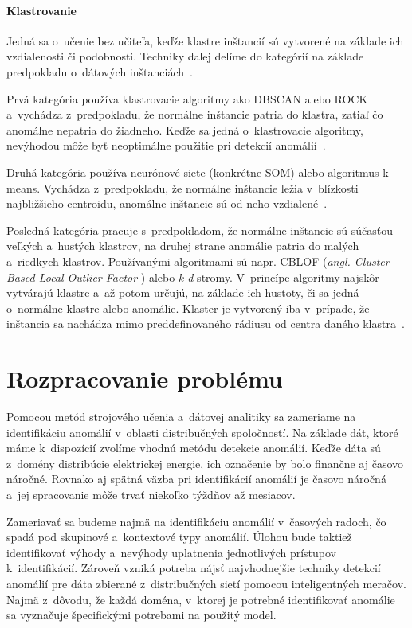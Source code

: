 \documentclass[a4paper,twoside,slovak,12pt]{article}
\begin{document}
\paragraph{Klastrovanie}
Jedná sa o~učenie bez učiteľa, keďže klastre inštancií sú vytvorené na základe
ich vzdialenosti či podobnosti. Techniky ďalej delíme do kategórií na základe
predpokladu o~dátových inštanciách~\cite{Chandola2009,Tan2005}.

Prvá kategória používa klastrovacie algoritmy ako DBSCAN alebo ROCK
a~vychádza z~predpokladu, že normálne inštancie patria do klastra, zatiaľ čo
anomálne nepatria do žiadneho. Keďže sa jedná o~klastrovacie algoritmy, nevýhodou
môže byť neoptimálne použitie pri detekcií anomálií~\cite{Chandola2009}.

Druhá kategória používa neurónové siete (konkrétne SOM) alebo algoritmus k-means.
Vychádza z~predpokladu, že normálne inštancie ležia v~blízkosti najbližšieho
centroidu, anomálne inštancie sú od neho vzdialené~\cite{Chandola2009}.

Posledná kategória pracuje s~predpokladom, že normálne inštancie sú súčasťou
veľkých a~hustých klastrov, na druhej strane anomálie patria do malých a~riedkych
klastrov. Používanými algoritmami sú napr. CBLOF (\textit{angl. Cluster-Based Local Outlier Factor}
) alebo \textit{k-d} stromy. V~princípe algoritmy najskôr vytvárajú klastre
a~až potom určujú, na základe ich hustoty, či sa jedná o~normálne klastre alebo
anomálie. Klaster je vytvorený iba v~prípade, že inštancia sa nachádza mimo
preddefinovaného rádiusu od centra daného klastra~\cite{Salvador2005}.


\newpage
\section{Rozpracovanie problému}
Pomocou metód strojového učenia a~dátovej analitiky sa zameriame na identifikáciu
anomálií v~oblasti distribučných spoločností. Na základe dát, ktoré máme
k~dispozícií zvolíme vhodnú metódu detekcie anomálií. Keďže dáta sú z~domény
distribúcie elektrickej energie, ich označenie by bolo finančne aj časovo
náročné. Rovnako aj spätná väzba pri identifikácií anomálií je časovo náročná
a~jej spracovanie môže trvať niekoľko týždňov až mesiacov.

Zameriavať sa budeme najmä na identifikáciu anomálií v~časových radoch, čo spadá
pod skupinové a~kontextové typy anomálií. Úlohou bude taktiež identifikovať
výhody a~nevýhody uplatnenia jednotlivých prístupov k~identifikácií. Zároveň
vzniká potreba nájsť najvhodnejšie techniky detekcií anomálií pre dáta zbierané
z~distribučných sietí pomocou inteligentných meračov. Najmä z~dôvodu, že každá
doména, v~ktorej je potrebné identifikovať anomálie sa vyznačuje špecifickými
potrebami na použitý model.



\newpage


\end{document}
